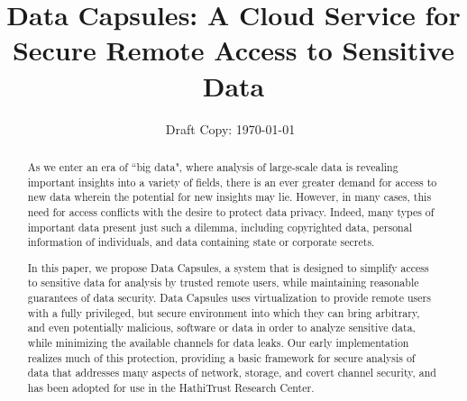 \documentclass{acm_proc_article-sp}
\begin{document}
\title{Data Capsules: A Cloud Service for Secure Remote Access to Sensitive Data}

\author{
Draft Copy: \today\ \currenttime
}

%

\maketitle
\begin{abstract}

As we enter an era of ``big data", where analysis of large-scale data is
revealing important insights into a variety of fields, there is an ever greater
demand for access to new data wherein the potential for new insights may lie.
However, in many cases, this need for access conflicts with the desire to
protect data privacy.  Indeed, many types of important data present just such a
dilemma, including copyrighted data, personal information of individuals, and
data containing state or corporate secrets.

In this paper, we propose Data Capsules, a system that is designed to simplify
access to sensitive data for analysis by trusted remote users, while
maintaining reasonable guarantees of data security.  Data Capsules uses
virtualization to provide remote users with a fully privileged, but secure
environment into which they can bring arbitrary, and even potentially
malicious, software or data in order to analyze sensitive data, while
minimizing the available channels for data leaks.  Our early implementation
realizes much of this protection, providing a basic framework for secure
analysis of data that addresses many aspects of network, storage, and covert
channel security, and has been adopted for use in the HathiTrust Research
Center.

\end{abstract}
\end{document}
